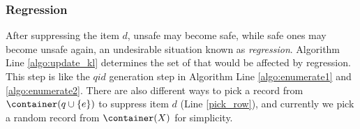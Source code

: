 \subsubsection{Regression}
After suppressing the item $d$, unsafe \qids may become safe, while safe ones
may become unsafe again, an undesirable situation known as {\em regression}.
Algorithm \SanitizeBuffer Line \ref{algo:update_kl} determines the set of
\qids that would be affected by regression. This step is like the $qid$
generation step in Algorithm \PartialSuppressor Line \ref{algo:enumerate1}
and \ref{algo:enumerate2}. There are also different ways to pick a
record from $\container(q\cup \{e\})$ to suppress item $d$ (Line
\ref{pick_row}), and currently we pick a random record from $\container(X)$
for simplicity.

